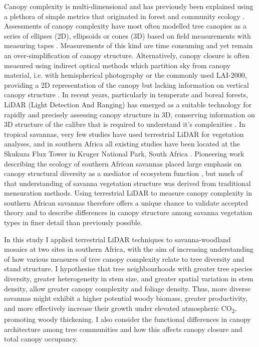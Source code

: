 \begin{refsection}
Canopy complexity is multi-dimensional and has previously been explained using a plethora of simple metrics that originated in forest and community ecology \citep{Kershaw2017}. Assessments of canopy complexity have most often modelled tree canopies as a series of ellipses (2D), ellipsoids or cones (3D) based on field measurements with measuring tapes \citep{Jucker2015}. Measurements of this kind are time consuming and yet remain an over-simplification of canopy structure. Alternatively, canopy closure is often measured using indirect optical methods which partition sky from canopy material, i.e. with hemispherical photography or the commonly used LAI-2000, providing a 2D representation of the canopy but lacking information on vertical canopy structure \citep{Jonckheere2004}. In recent years, particularly in temperate and boreal forests, LiDAR (Light Detection And Ranging) has emerged as a suitable technology for rapidly and precisely assessing canopy structure in 3D, conserving information on 3D structure of the calibre that is required to understand it's complexities \citep{Muir2018, Calders2020}. In tropical savannas, very few studies have used terrestrial LiDAR for vegetation analyses, and in southern Africa all existing studies have been located at the Skukuza Flux Tower in Kruger National Park, South Africa \citep{Muumbe2021}. Pioneering work describing the ecology of southern African savannas placed large emphasis on canopy structural diversity as a mediator of ecosystem function \citep{Solbrig1996}, but much of that understanding of savanna vegetation structure was derived from traditional mensuration methods. Using terrestrial LiDAR to measure canopy complexity in southern African savannas therefore offers a unique chance to validate accepted theory and to describe differences in canopy structure among savanna vegetation types in finer detail than previously possible.

In this study I applied terrestrial LiDAR techniques to savanna-woodland mosaics at two sites in southern Africa, with the aim of increasing understanding of how various measures of tree canopy complexity relate to tree diversity and stand structure. I hypothesise that tree neighbourhoods with greater tree species diversity, greater heterogeneity in stem size, and greater spatial variation in stem density, allow greater canopy complexity and foliage density. Thus, more diverse savannas might exhibit a higher potential woody biomass, greater productivity, and more effectively increase their growth under elevated atmospheric CO\textsubscript{2}, promoting woody thickening. I also consider the functional differences in canopy architecture among tree communities and how this affects canopy closure and total canopy occupancy.


\end{refsection}
